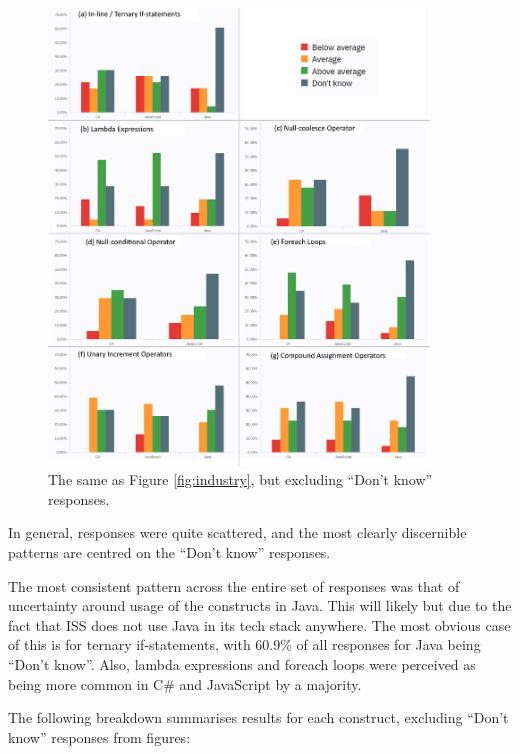 \documentclass{article}
\begin{document}
            \begin{figure}[htbp]
                \centering
                \includegraphics[width=0.9\textwidth]{industry.png}
                \caption{The same as Figure \ref{fig:industry}, but excluding ``Don't know'' responses.}
                \label{fig:industryExcl}
            \end{figure}

            In general, responses were quite scattered, and the most clearly discernible patterns are centred on the ``Don't know'' responses.

            The most consistent pattern across the entire set of responses was that of uncertainty around usage of the constructs in Java. This will likely but due to the fact that ISS does not use Java in its tech stack anywhere. The most obvious case of this is for ternary if-statements, with 60.9\% of all responses for Java being ``Don't know''. Also, lambda expressions and foreach loops were perceived as being more common in C\# and JavaScript by a majority.

            The following breakdown summarises results for each construct, excluding ``Don't know'' responses from figures:
            
\end{document}
